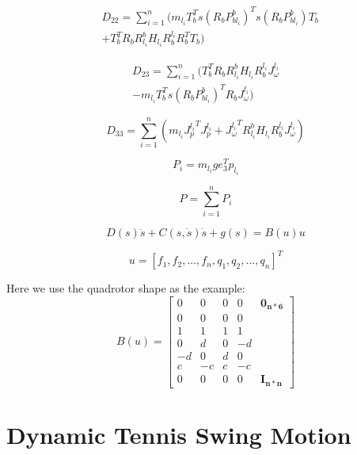 \documentclass{jarticle}
\begin{document}
\begin{eqnarray}
  & D_{22} = \sum_{i=1}^{n}(m_{l_i} T_b^T s(R_b P_{bl_i}^b)^T s(R_b P_{bl_i}^b) T_b \\ \nonumber
  & + T_b^T R_b R_{l_i}^b H_{l_i} R_b^{l_i} R_b^T T_b)
\end{eqnarray}

\begin{eqnarray}
  D_{23} = \sum_{i=1}^{n}(T_b^T R_b R_{l_i}^b H_{l_i} R_b^{l_i} J_\omega^{l_i} \\
  \nonumber
  - m_{l_i} T_b^T s(R_b P_{bl_i}^b)^T R_b J_\omega^{l_i})
\end{eqnarray}

\begin{equation}
  D_{33} = \sum_{i=1}^{n}(m_{l_i} {J_p^{l_i}}^T J_p^{l_i}
  + {J_\omega^{l_i}}^T R_{l_i}^b H_{l_i} R_b^{l_i} J_\omega^{l_i})
\end{equation}

\begin{equation}
  P_i = m_{l_i} g e_3^T p_{l_i}
\end{equation}

\begin{equation}
  P = \sum_{i=1}^{n}{P_i}
\end{equation}

\begin{equation}
  D(s) \ddot{s} + C(s, \dot{s}) \dot{s} + g(s) = B(u) u
\end{equation}

\begin{equation}
  u = [f_1, f_2, ..., f_n, q_1, q_2, ..., q_n]^T
\end{equation}

Here we use the quadrotor shape as the example:
\begin{equation}
  B(u) = \begin{bmatrix}
    0 & 0 & 0 & 0 & \bm{0_{n*6}} \\
    0 & 0 & 0 & 0  \\
    1 & 1 & 1 & 1  \\
    0 & d & 0 & -d \\
    -d & 0 & d & 0 \\
    c & -c & c & -c \\
    0 & 0 & 0 & 0 & \bm{I_{n*n}}
  \end{bmatrix}
\end{equation}



\section{Dynamic Tennis Swing Motion}
\end{document}
